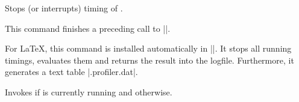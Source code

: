 \begin{command}{\pgfprofileend{}}
	Stops (or interrupts) timing of . 
	
	This command finishes a preceding call to |\pgfprofilestart|.
\end{command}

\begin{command}{\pgfprofilepostprocess}
	For \LaTeX, this command is installed automatically in ||. It stops all running timings, evaluates them and returns the result into the logfile. Furthermore, it generates a text table |\jobname.profiler.dat|.
\end{command}

\begin{command}{\pgfprofileifisrunning{}}
	Invokes  if  is currently running and  otherwise.
\end{command}
